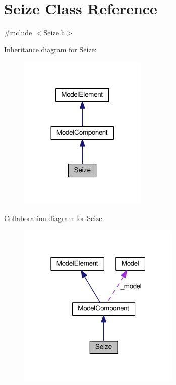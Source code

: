 \hypertarget{class_seize}{}\section{Seize Class Reference}
\label{class_seize}


{\ttfamily \#include $<$Seize.\+h$>$}



Inheritance diagram for Seize\+:\nopagebreak
\begin{figure}[H]
\begin{center}
\leavevmode
\includegraphics[width=173pt]{class_seize__inherit__graph}
\end{center}
\end{figure}


Collaboration diagram for Seize\+:\nopagebreak
\begin{figure}[H]
\begin{center}
\leavevmode
\includegraphics[width=220pt]{class_seize__coll__graph}
\end{center}
\end{figure}
